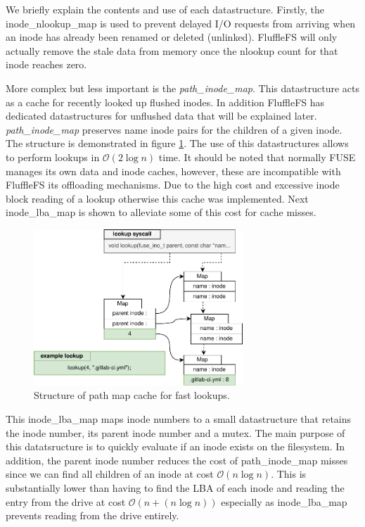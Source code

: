 We briefly explain the contents and use of each datastructure. Firstly, the
inode\_nlookup\_map is used to prevent delayed I/O requests from arriving when
an inode has already been renamed or deleted (unlinked). FluffleFS will only
actually remove the stale data from memory once the nlookup count for that inode
reaches zero.

More complex but less important is the \textit{path\_inode\_map}. This
datastructure acts as a cache for recently looked up flushed inodes. In addition
FluffleFS has dedicated datastructures for unflushed data that will be explained
later. \textit{path\_inode\_map} preserves name inode pairs for the children of
a given inode. The structure is demonstrated in figure
\ref{figure:flufflepathmap}. The use of this datastructures allows to perform
lookups in $\mathcal{O}(2 \log n)$ time. It should be noted that normally FUSE
manages its own data and inode caches, however, these are incompatible with
FluffleFS its offloading mechanisms. Due to the high cost and excessive inode
block reading of a lookup
otherwise this cache was implemented. Next inode\_lba\_map is shown to alleviate
some of this cost for cache misses.

\begin{figure}[h!]
    \centering
	\includegraphics[width=0.7\textwidth]{resources/images/fluffle-path-map.pdf}
	\caption{Structure of path map cache for fast lookups.}
    \label{figure:flufflepathmap}
\end{figure}

This inode\_lba\_map maps inode numbers to a small datastructure that retains
the inode number, its parent inode number and a mutex. The main purpose of this
datatsructure is to quickly evaluate if an inode exists on the filesystem. In
addition, the parent inode number reduces the cost of path\_inode\_map misses
since we can find all children of an inode at cost $\mathcal{O}(n \log n)$. This
is substantially lower than having to find the LBA of each inode and reading
the entry from the drive at cost $\mathcal{O}(n + (n \log n))$ especially as
inode\_lba\_map prevents reading from the drive entirely.

